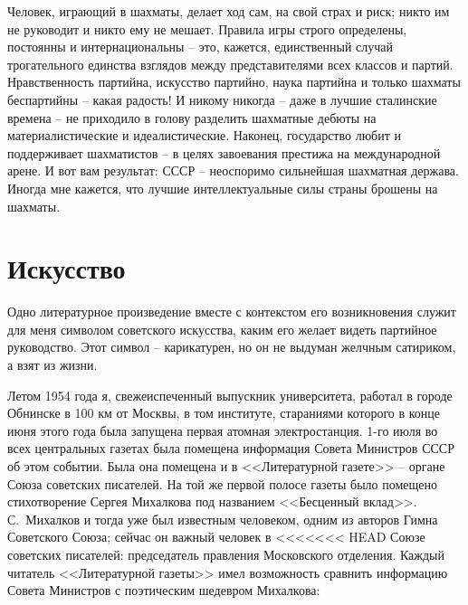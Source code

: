 \documentclass{book}
\begin{document}
Человек, играющий в шахматы, делает ход сам,  на свой страх и риск; никто им не руководит и никто ему не мешает. Правила игры 
строго определены, постоянны и интернациональны --  это, кажется, единственный случай трогательного единства взглядов между 
представителями всех классов и партий. Нравственность партийна, искусство партийно, наука партийна и только шахматы беспартийны 
-- какая радость! И никому никогда -- даже в лучшие сталинские времена -- не приходило в голову разделить шахматные дебюты на 
материалистические и идеалистические. Наконец, государство любит и поддерживает шахматистов -- в целях завоевания престижа на 
международной арене. И вот вам результат: СССР -- неоспоримо сильнейшая шахматная держава.
Иногда мне кажется, что лучшие интеллектуальные силы страны брошены на шахматы.


\section{Искусство}

Одно литературное произведение вместе с контекстом его возникновения служит для меня символом советского искусства, каким его 
желает видеть партийное руководство. Этот символ -- карикатурен, но он не выдуман желчным сатириком, а взят из жизни.

Летом 1954 года я, свежеиспеченный выпускник университета, работал в городе Обнинске в 100 км от Москвы, в том институте, 
стараниями которого в конце июня этого года была запущена первая атомная электростанция. 1-го июля во всех центральных газетах 
была помещена информация Совета Министров СССР об этом событии. Была она помещена и в <<Литературной газете>> -- органе Союза 
советских писателей. На той же первой полосе газеты было помещено стихотворение Сер­гея Михалкова под названием <<Бесценный 
вклад>>. С.~Михалков и тогда уже был известным человеком, одним из авторов Гимна Советского Союза; сейчас он важный человек в 
<<<<<<< HEAD
Союзе советских писателей: председатель правления Московского отделения. Каждый читатель <<Литературной газеты>> имел возможность 
сравнить информацию Совета Министров с поэтическим шедевром Михалкова:
\end{document}
